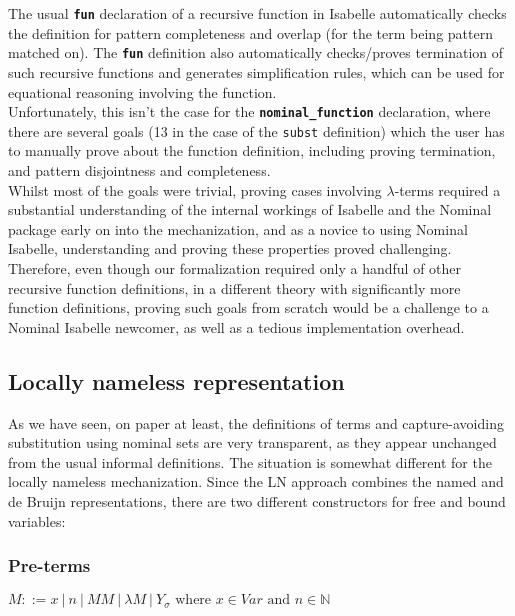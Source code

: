 \documentclass[a4paper, 12pt, twoside]{style/ociamthesis}
\theoremstyle{plain}
\theoremstyle{definition}
\newtheorem{Definition}{Definition}[chapter]
\theoremstyle{remark}
\renewenvironment{Definition}{\begin{OldDefinition}\begin{mdframed}[style=example, linecolor=cyan]}{\end{mdframed}\end{OldDefinition}}
\begin{document}
The usual \textbf{\texttt{fun}} declaration of a recursive function in
Isabelle automatically checks the definition for pattern completeness
and overlap (for the term being pattern matched on). The
\textbf{\texttt{fun}} definition also automatically checks/proves
termination of such recursive functions and generates simplification
rules, which can be used for equational reasoning involving the
function.\\
Unfortunately, this isn't the case for the
\textbf{\texttt{nominal\_function}} declaration, where there are several
goals (13 in the case of the \texttt{subst} definition) which the user
has to manually prove about the function definition, including proving
termination, and pattern disjointness and completeness.\\
Whilst most of the goals were trivial, proving cases involving
\(\lambda\)-terms required a substantial understanding of the internal
workings of Isabelle and the Nominal package early on into the
mechanization, and as a novice to using Nominal Isabelle, understanding
and proving these properties proved challenging. Therefore, even though
our formalization required only a handful of other recursive function
definitions, in a different theory with significantly more function
definitions, proving such goals from scratch would be a challenge to a
Nominal Isabelle newcomer, as well as a tedious implementation overhead.

\subsection{Locally nameless
representation}\label{locally-nameless-representation}

As we have seen, on paper at least, the definitions of terms and
capture-avoiding substitution using nominal sets are very transparent,
as they appear unchanged from the usual informal definitions. The
situation is somewhat different for the locally nameless mechanization.
Since the LN approach combines the named and de Bruijn representations,
there are two different constructors for free and bound variables:

\subsubsection{Pre-terms}\label{pre-terms}

\begin{Definition}[LN pre-terms]

\label{Definition:pterms}

\begin{center}
$M::= x\ |\ n\ |\ MM\ |\ \lambda M\ |\ Y_\sigma \text{ where }x \in Var \text{ and } n \in \mathbb{N}$
\end{center}

\end{Definition}
\end{document}
